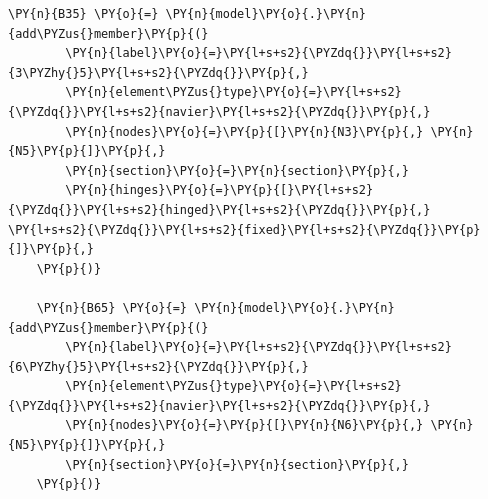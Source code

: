 \begin{tcolorbox}[breakable, size=fbox, boxrule=1pt, pad at break*=1mm,colback=cellbackground, colframe=cellborder]
\begin{Verbatim}[commandchars=\\\{\}]
    \PY{n}{B35} \PY{o}{=} \PY{n}{model}\PY{o}{.}\PY{n}{add\PYZus{}member}\PY{p}{(}
        \PY{n}{label}\PY{o}{=}\PY{l+s+s2}{\PYZdq{}}\PY{l+s+s2}{3\PYZhy{}5}\PY{l+s+s2}{\PYZdq{}}\PY{p}{,}
        \PY{n}{element\PYZus{}type}\PY{o}{=}\PY{l+s+s2}{\PYZdq{}}\PY{l+s+s2}{navier}\PY{l+s+s2}{\PYZdq{}}\PY{p}{,}
        \PY{n}{nodes}\PY{o}{=}\PY{p}{[}\PY{n}{N3}\PY{p}{,} \PY{n}{N5}\PY{p}{]}\PY{p}{,}
        \PY{n}{section}\PY{o}{=}\PY{n}{section}\PY{p}{,}
        \PY{n}{hinges}\PY{o}{=}\PY{p}{[}\PY{l+s+s2}{\PYZdq{}}\PY{l+s+s2}{hinged}\PY{l+s+s2}{\PYZdq{}}\PY{p}{,} \PY{l+s+s2}{\PYZdq{}}\PY{l+s+s2}{fixed}\PY{l+s+s2}{\PYZdq{}}\PY{p}{]}\PY{p}{,}
    \PY{p}{)}
    
    \PY{n}{B65} \PY{o}{=} \PY{n}{model}\PY{o}{.}\PY{n}{add\PYZus{}member}\PY{p}{(}
        \PY{n}{label}\PY{o}{=}\PY{l+s+s2}{\PYZdq{}}\PY{l+s+s2}{6\PYZhy{}5}\PY{l+s+s2}{\PYZdq{}}\PY{p}{,}
        \PY{n}{element\PYZus{}type}\PY{o}{=}\PY{l+s+s2}{\PYZdq{}}\PY{l+s+s2}{navier}\PY{l+s+s2}{\PYZdq{}}\PY{p}{,}
        \PY{n}{nodes}\PY{o}{=}\PY{p}{[}\PY{n}{N6}\PY{p}{,} \PY{n}{N5}\PY{p}{]}\PY{p}{,}
        \PY{n}{section}\PY{o}{=}\PY{n}{section}\PY{p}{,}
    \PY{p}{)}
    \end{Verbatim}
\end{tcolorbox}

